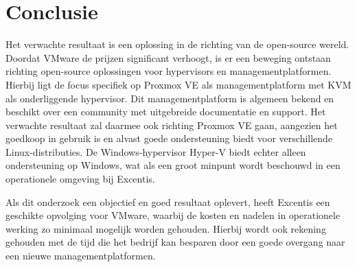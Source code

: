 
\chapter{Conclusie}%
\label{ch:conclusie}


Het verwachte resultaat is een oplossing in de richting van de open-source wereld. Doordat VMware de prijzen significant verhoogt, is er een beweging ontstaan richting open-source oplossingen voor hypervisors en managementplatformen.
Hierbij ligt de focus specifiek op Proxmox VE als managementplatform met KVM als onderliggende hypervisor. Dit managementplatform is algemeen bekend en beschikt over een community met uitgebreide documentatie en support.
Het verwachte resultaat zal daarmee ook richting Proxmox VE gaan, aangezien het goedkoop in gebruik is en alvast goede ondersteuning biedt voor verschillende Linux-distributies.
De Windows-hypervisor Hyper-V biedt echter alleen ondersteuning op Windows, wat als een groot minpunt wordt beschouwd in een operationele omgeving bij Excentis.

Als dit onderzoek een objectief en goed resultaat oplevert, heeft Excentis een geschikte opvolging voor VMware, waarbij de kosten en nadelen in operationele werking zo minimaal mogelijk worden gehouden.
Hierbij wordt ook rekening gehouden met de tijd die het bedrijf kan besparen door een goede overgang naar een nieuwe managementplatformen.